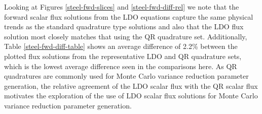 Looking at Figures \ref{steel-fwd-slices} and \ref{steel-fwd-diff-rel} we note that
the forward scalar flux solutions from the LDO equations capture the same physical
trends as the standard quadrature type solutions and also that the LDO flux solution
most closely matches that using the QR quadrature set. Additionally, Table 
\ref{steel-fwd-diff-table} shows an average difference of 2.2\% between the
plotted flux solutions from the representative LDO and QR quadrature sets, which is 
the lowest average difference seen in the comparisons here. As QR quadratures are 
commonly used for Monte Carlo variance reduction parameter generation, the relative 
agreement of the LDO scalar flux with the QR scalar flux motivates the exploration of 
the use of LDO scalar flux solutions for Monte Carlo variance reduction parameter 
generation.

